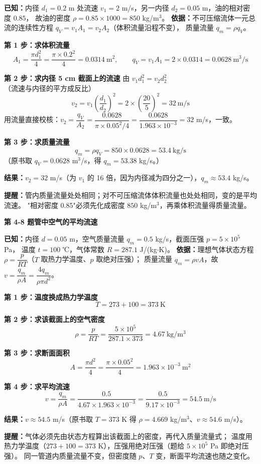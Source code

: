 \begin{jie}
\textbf{已知：}内径 $d_1=0.2$ m 处流速 $v_1=2$ m/s，另一内径 $d_2=0.05$ m，油的相对密度 $0.85$，
故油的密度 $\rho=0.85\times1000=850$ kg/m$^3$。
\textbf{依据：}不可压缩流体一元总流的连续性方程 $q_V=v_1A_1=v_2A_2$（体积流量沿程不变），
质量流量 $q_m=\rho q_V$。

\textbf{第 1 步：求体积流量}
\[ A_1=\frac{\pi d_1^2}{4}=\frac{\pi\times0.2^2}{4}=0.0314\ \mathrm{m^2},\qquad
   q_V=v_1A_1=2\times0.0314=0.0628\ \mathrm{m^3/s} \]

\textbf{第 2 步：求内径 5 cm 截面上的流速}
由 $v_1d_1^2=v_2d_2^2$（流速与内径的平方成反比）
\[ v_2=v_1\left(\frac{d_1}{d_2}\right)^2=2\times\left(\frac{20}{5}\right)^2=32\ \mathrm{m/s} \]
用流量直接校核：$v_2=\dfrac{q_V}{A_2}=\dfrac{0.0628}{\pi\times0.05^2/4}=\dfrac{0.0628}{1.963\times10^{-3}}=32$ m/s，一致。

\textbf{第 3 步：求质量流量}
\[ q_m=\rho q_V=850\times0.0628=53.4\ \mathrm{kg/s} \]
（原书取 $q_V=0.0628$ m$^3$/s，得 $q_m=53.38$ kg/s。）

\textbf{结果：}$v_2=32$ m/s（为 $v_1$ 的 16 倍，因为内径减为四分之一），$q_m\approx53.4$ kg/s。

\textbf{提醒：}管内质量流量处处相同；对不可压缩流体体积流量也处处相同，变的是平均流速。
"相对密度 0.85"必须先化成密度 $850$ kg/m$^3$，再乘体积流量得质量流量。
\end{jie}

\noindent\textbf{第 4-8 题\quad 管中空气的平均流速}

\begin{jie}
\textbf{已知：}内径 $d=0.05$ m，空气质量流量 $q_m=0.5$ kg/s，截面压强 $p=5\times10^5$ Pa，
温度 $t=100$ ℃，气体常数 $R=287.1$ J/(kg$\cdot$K)。
\textbf{依据：}理想气体状态方程 $\rho=\dfrac{p}{RT}$（$T$ 取热力学温度、$p$ 取绝对压强）；
质量流量 $q_m=\rho vA$，故 $v=\dfrac{q_m}{\rho A}=\dfrac{4q_m}{\rho\pi d^2}$。

\textbf{第 1 步：温度换成热力学温度}
\[ T=273+100=373\ \mathrm{K} \]

\textbf{第 2 步：求该截面上的空气密度}
\[ \rho=\frac{p}{RT}=\frac{5\times10^5}{287.1\times373}=4.67\ \mathrm{kg/m^3} \]

\textbf{第 3 步：求断面面积}
\[ A=\frac{\pi d^2}{4}=\frac{\pi\times0.05^2}{4}=1.963\times10^{-3}\ \mathrm{m^2} \]

\textbf{第 4 步：求平均流速}
\[ v=\frac{q_m}{\rho A}=\frac{0.5}{4.67\times1.963\times10^{-3}}=\frac{0.5}{9.17\times10^{-3}}=54.5\ \mathrm{m/s} \]

\textbf{结果：}$v\approx54.5$ m/s（原书取 $T=373$ K 得 $\rho=4.669$ kg/m$^3$、$v\approx54.6$ m/s）。

\textbf{提醒：}气体必须先由状态方程算出该截面上的密度，再代入质量流量式；
温度用热力学温度（$273+100=373$ K），压强用绝对压强（题给 $5\times10^5$ Pa 即绝对压强）。
同一管道内质量流量不变，但密度随 $p$、$T$ 变，断面平均流速也随之变化。
\end{jie}

